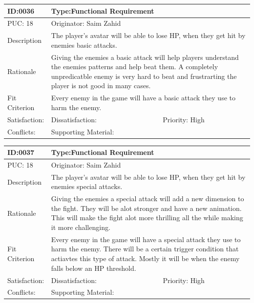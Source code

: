 \documentclass{article}
\begin{document}
	\begin{table}[H]
		\begin{tabular}{|l|l|l|}
			\hline
			ID:0036 & \multicolumn{2}{l|}{Type:Functional Requirement} \\ \hline
			PUC: 18 & \multicolumn{2}{l|}{Originator: Saim Zahid} \\ \hline
			Description & \multicolumn{2}{m{0.85\textwidth}|}{The player's avatar will be able to lose HP, when they get hit by enemies basic attacks.} \\ \hline
			Rationale & \multicolumn{2}{m{0.85\textwidth}|}{Giving the enemies a basic attack will help players understand the enemies patterns and help beat them. A completely unpredicatble enemy is very hard to beat and frustrarting the player is not good in many cases.} \\ \hline
			Fit Criterion & \multicolumn{2}{m{0.85\textwidth}|}{Every enemy in the game will have a basic attack they use to harm the enemy.} \\ \hline
			Satisfaction: & Dissatisfaction: & Priority: High\\ \hline
			Conflicts: & \multicolumn{2}{l|}{Supporting Material:} \\ \hline
		\end{tabular}
	\end{table}

	\begin{table}[H]
		\begin{tabular}{|l|l|l|}
			\hline
			ID:0037 & \multicolumn{2}{l|}{Type:Functional Requirement} \\ \hline
			PUC: 18 & \multicolumn{2}{l|}{Originator: Saim Zahid} \\ \hline
			Description & \multicolumn{2}{m{0.85\textwidth}|}{The player's avatar will be able to lose HP, when they get hit by enemies special attacks.} \\ \hline
			Rationale & \multicolumn{2}{m{0.85\textwidth}|}{Giving the enemies a special attack will add a new dimension to the fight. They will be alot stronger and have a new animation. This will make the fight alot more thrilling all the while making it more challenging.} \\ \hline
			Fit Criterion & \multicolumn{2}{m{0.85\textwidth}|}{Every enemy in the game will have a special attack they use to harm the enemy. There will be a certain trigger condition that actiavtes this type of attack. Mostly it will be when the enemy falls below an HP threshold.} \\ \hline
			Satisfaction: & Dissatisfaction: & Priority: High\\ \hline
			Conflicts: & \multicolumn{2}{l|}{Supporting Material:} \\ \hline
		\end{tabular}
	\end{table}
\end{document}
